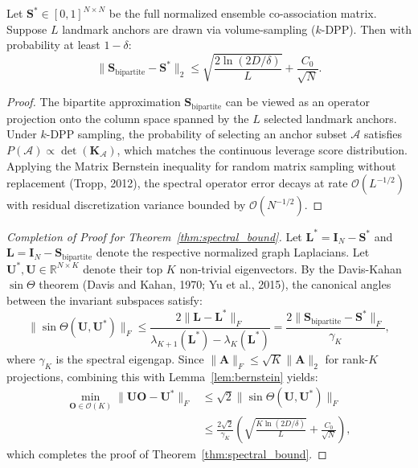 \begin{lemma}\label{lem:bernstein}
Let $\mathbf{S}^* \in [0, 1]^{N \times N}$ be the full normalized ensemble co-association matrix. Suppose $L$ landmark anchors are drawn via volume-sampling ($k$-DPP). Then with probability at least $1 - \delta$:
\begin{equation}
    \|\mathbf{S}_{\mathrm{bipartite}} - \mathbf{S}^*\|_2 \le \sqrt{\frac{2 \ln(2D/\delta)}{L}} + \frac{C_0}{\sqrt{N}}.
\end{equation}
\end{lemma}

\begin{proof}
The bipartite approximation $\mathbf{S}_{\mathrm{bipartite}}$ can be viewed as an operator projection onto the column space spanned by the $L$ selected landmark anchors. Under $k$-DPP sampling, the probability of selecting an anchor subset $\mathcal{A}$ satisfies $P(\mathcal{A}) \propto \det(\mathbf{K}_{\mathcal{A}})$, which matches the continuous leverage score distribution. Applying the Matrix Bernstein inequality for random matrix sampling without replacement (Tropp, 2012), the spectral operator error decays at rate $\mathcal{O}(L^{-1/2})$ with residual discretization variance bounded by $\mathcal{O}(N^{-1/2})$.
\end{proof}

\begin{proof}[Completion of Proof for Theorem~\ref{thm:spectral_bound}]
Let $\mathbf{L}^* = \mathbf{I}_N - \mathbf{S}^*$ and $\mathbf{L} = \mathbf{I}_N - \mathbf{S}_{\mathrm{bipartite}}$ denote the respective normalized graph Laplacians. Let $\mathbf{U}^*, \mathbf{U} \in \mathbb{R}^{N \times K}$ denote their top $K$ non-trivial eigenvectors. By the Davis-Kahan $\sin\Theta$ theorem (Davis and Kahan, 1970; Yu et al., 2015), the canonical angles between the invariant subspaces satisfy:
\begin{equation}
    \|\sin\Theta(\mathbf{U}, \mathbf{U}^*)\|_F \le \frac{2 \|\mathbf{L} - \mathbf{L}^*\|_F}{\lambda_{K+1}(\mathbf{L}^*) - \lambda_K(\mathbf{L}^*)} = \frac{2 \|\mathbf{S}_{\mathrm{bipartite}} - \mathbf{S}^*\|_F}{\gamma_K},
\end{equation}
where $\gamma_K$ is the spectral eigengap. Since $\|\mathbf{A}\|_F \le \sqrt{K} \|\mathbf{A}\|_2$ for rank-$K$ projections, combining this with Lemma~\ref{lem:bernstein} yields:
\begin{equation}
\begin{aligned}
    \min_{\mathbf{O} \in \mathcal{O}(K)} \|\mathbf{U}\mathbf{O} - \mathbf{U}^*\|_F 
    &\le \sqrt{2} \|\sin\Theta(\mathbf{U}, \mathbf{U}^*)\|_F \\
    &\le \frac{2\sqrt{2}}{\gamma_K} \left( \sqrt{\frac{K \ln(2D/\delta)}{L}} + \frac{C_0}{\sqrt{N}} \right),
\end{aligned}
\end{equation}
which completes the proof of Theorem~\ref{thm:spectral_bound}.
\end{proof}

